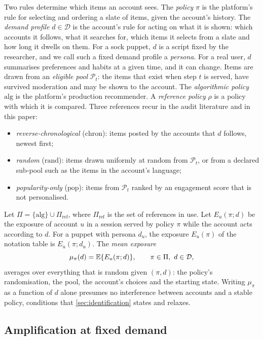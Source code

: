 Two rules determine which items an account sees. The \emph{policy} $\pi$ is the platform's rule for selecting and ordering a slate of items, given the account's history. The \emph{demand profile} $d\in\mathcal D$ is the account's rule for acting on what it is shown: which accounts it follows, what it searches for, which items it selects from a slate and how long it dwells on them. For a sock puppet, $d$ is a script fixed by the researcher, and we call such a fixed demand profile a \emph{persona}. For a real user, $d$ summarises preferences and habits at a given time, and it can change. Items are drawn from an \emph{eligible pool} $\mathcal P_t$: the items that exist when step $t$ is served, have survived moderation and may be shown to the account. The \emph{algorithmic policy} $\mathrm{alg}$ is the platform's production recommender. A \emph{reference policy} $\rho$ is a policy with which it is compared. Three references recur in the audit literature and in this paper:
\begin{itemize}
  \item \emph{reverse-chronological} ($\mathrm{chron}$): items posted by the accounts that $d$ follows, newest first;
  \item \emph{random} ($\mathrm{rand}$): items drawn uniformly at random from $\mathcal P_t$, or from a declared sub-pool such as the items in the account's language;
  \item \emph{popularity-only} ($\mathrm{pop}$): items from $\mathcal P_t$ ranked by an engagement score that is not personalised.
\end{itemize}
Let $\Pi=\{\mathrm{alg}\}\cup\Pi_{\mathrm{ref}}$, where $\Pi_{\mathrm{ref}}$ is the set of references in use. Let $E_u(\pi;d)$ be the exposure of account $u$ in a session served by policy $\pi$ while the account acts according to $d$. For a puppet with persona $d_u$, the exposure $E_u(\pi)$ of the notation table is $E_u(\pi;d_u)$. The \emph{mean exposure}
\begin{equation}\label{eq:est-mu}
  \mu_\pi(d)=\mathbb{E}\{E_u(\pi;d)\},\qquad \pi\in\Pi,\ d\in\mathcal D,
\end{equation}
averages over everything that is random given $(\pi,d)$: the policy's randomisation, the pool, the account's choices and the starting state. Writing $\mu_\pi$ as a function of $d$ alone presumes no interference between accounts and a stable policy, conditions that \cref{sec:identification} states and relaxes.

\subsection{Amplification at fixed demand}\label{sec:est-amp}

